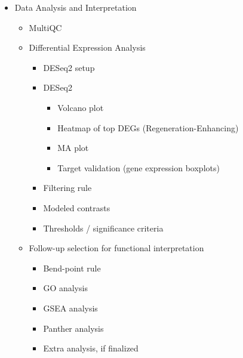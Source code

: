 \documentclass[12pt]{article}
\begin{document}
\begin{itemize}
\begin{itemize}
\begin{itemize}
\item \textcolor{nikhicolor}{STAR index and alignment}
\begin{itemize}
\item \textcolor{nikhicolor}{Building the STAR genome}
\item \textcolor{nikhicolor}{Paired-end alignment}
\end{itemize}
\item \textcolor{pitercolor}{GeneCounts output}
\item \textcolor{pitercolor}{BAM / log / count outputs}
\item \textcolor{pitercolor}{Family count matrix assembly}
\end{itemize}
\item \textcolor{samcolor}{Data Analysis and Interpretation}
\begin{itemize}
\item \textcolor{samcolor}{MultiQC}
\item \textcolor{samcolor}{Differential Expression Analysis}
\begin{itemize}
\item \textcolor{samcolor}{DESeq2 setup}
\item \textcolor{samcolor}{DESeq2}
\begin{itemize}
\item \textcolor{samcolor}{Volcano plot}
\item \textcolor{samcolor}{Heatmap of top DEGs (Regeneration-Enhancing)}
\item \textcolor{pitercolor}{MA plot}
\item \textcolor{samcolor}{Target validation (gene expression boxplots)}
\end{itemize}
\item \textcolor{pitercolor}{Filtering rule}
\item \textcolor{pitercolor}{Modeled contrasts}
\item \textcolor{pitercolor}{Thresholds / significance criteria}
\end{itemize}
\item \textcolor{samcolor}{Follow-up selection for functional interpretation}
\begin{itemize}
\item \textcolor{pitercolor}{Bend-point rule}
\item \textcolor{samcolor}{GO analysis}
\item \textcolor{samcolor}{GSEA analysis}
\item \textcolor{samcolor}{Panther analysis}
\item \textcolor{samcolor}{Extra analysis, if finalized}
\end{itemize}
\end{itemize}
\end{itemize}
\end{itemize}
\end{document}
